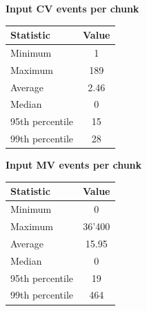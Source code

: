 \begin{multicols}{2}
\centering
\textbf{Input CV events per chunk}
\begin{center}
 \begin{tabular}{| l | c |}
  \hline
  \textbf{Statistic} & \textbf{Value} \\ \hline
  Minimum & 1 \\ \hline
  Maximum & 189 \\ \hline
  Average & 2.46 \\ \hline
  Median & 0 \\ \hline
  95th percentile & 15 \\ \hline
  99th percentile & 28 \\
  \hline
 \end{tabular}
\end{center}\columnbreak
\textbf{Input MV events per chunk}
\begin{center}
 \begin{tabular}{| l | c |}
  \hline
  \textbf{Statistic} & \textbf{Value} \\ \hline
  Minimum & 0 \\ \hline
  Maximum & 36'400 \\ \hline
  Average & 15.95 \\ \hline
  Median & 0 \\ \hline
  95th percentile & 19 \\ \hline
  99th percentile & 464 \\
  \hline
 \end{tabular}
\end{center}
\end{multicols}

